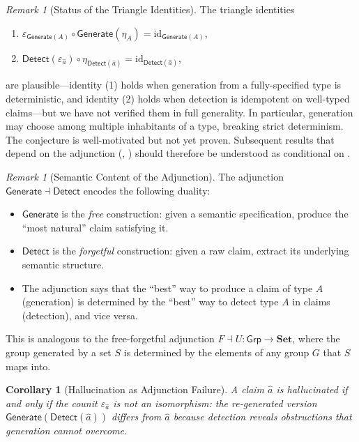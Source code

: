 \documentclass[11pt,a4paper]{article}
\theoremstyle{plain}
\newtheorem{corollary}[theorem]{Corollary}
\theoremstyle{definition}
\theoremstyle{remark}
\newtheorem{remark}[theorem]{Remark}
\newcommand{\Set}{\mathbf{Set}}
\newcommand{\id}{\mathrm{id}}
\newcommand{\Detect}{\mathsf{Detect}}
\newcommand{\Generate}{\mathsf{Generate}}
\begin{document}
\begin{remark}[Status of the Triangle Identities]\label{rem:triangle-status}
The triangle identities
\begin{enumerate}[nosep]
  \item $\varepsilon_{\Generate(A)} \circ \Generate(\eta_A) = \id_{\Generate(A)}$,
  \item $\Detect(\varepsilon_{\hat{a}}) \circ \eta_{\Detect(\hat{a})} = \id_{\Detect(\hat{a})}$,
\end{enumerate}
are plausible---identity (1) holds when generation from a fully-specified type is deterministic, and identity (2) holds when detection is idempotent on well-typed claims---but we have not verified them in full generality. In particular, generation may choose among multiple inhabitants of a type, breaking strict determinism. The conjecture is well-motivated but not yet proven. Subsequent results that depend on the adjunction (, ) should therefore be understood as conditional on .
\end{remark}

\begin{remark}[Semantic Content of the Adjunction]\label{rem:adjunction-meaning}
The adjunction $\Generate \dashv \Detect$ encodes the following duality:
\begin{itemize}[nosep]
  \item $\Generate$ is the \emph{free} construction: given a semantic specification, produce the ``most natural'' claim satisfying it.
  \item $\Detect$ is the \emph{forgetful} construction: given a raw claim, extract its underlying semantic structure.
  \item The adjunction says that the ``best'' way to produce a claim of type $A$ (generation) is determined by the ``best'' way to detect type $A$ in claims (detection), and vice versa.
\end{itemize}
This is analogous to the free-forgetful adjunction $F \dashv U\colon \mathsf{Grp} \to \Set$, where the group generated by a set $S$ is determined by the elements of any group $G$ that $S$ maps into.
\end{remark}

\begin{corollary}[Hallucination as Adjunction Failure]\label{cor:hall-adjunction}
A claim $\hat{a}$ is hallucinated if and only if the counit $\varepsilon_{\hat{a}}$ is not an isomorphism: the re-generated version $\Generate(\Detect(\hat{a}))$ differs from $\hat{a}$ because detection reveals obstructions that generation cannot overcome.
\end{corollary}
\end{document}
